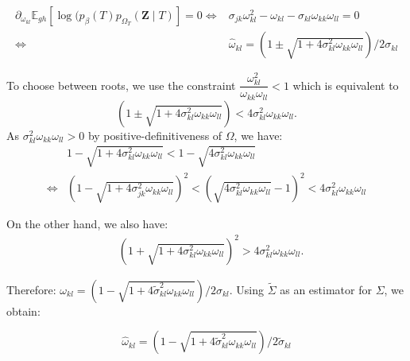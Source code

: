 \documentclass[11pt,a4paper]{article}
\newcommand{\Zbf}{\boldsymbol{Z}}
\newcommand{\Esp}{\mathds{E}}
\begin{document}
 \begin{align*}
  \partial_{\omega_{kl}}\Esp_{gh} [\log (p_\beta(T)p_{\Omega_T}(\Zbf\mid T) ] = 0 \iff & {\sigma}_{jk} \omega_{kl}^2 - \omega_{kl} - {\sigma}_{kl} \omega_{kk}\omega_{ll} = 0 \\
 \iff & \widehat{\omega}_{kl} = (1 \pm \sqrt{1+4{\sigma}_{kl}^2 \omega_{kk}\omega_{ll}}) / 2{\sigma}_{kl}
\end{align*}

To choose between roots, we use the constraint $\dfrac{\omega_{kl}^2}{\omega_{kk}\omega_{ll}} < 1$ which is equivalent to 
$$ (1 \pm \sqrt{1+4{\sigma}_{kl}^2 \omega_{kk}\omega_{ll}}) < 4{\sigma}_{kl}^2 \omega_{kk}\omega_{ll}.$$
As ${\sigma}_{kl}^2 \omega_{kk}\omega_{ll} > 0$ by positive-definitiveness of $\Omega$, we have:
\begin{align*}
&1 - \sqrt{1+4{\sigma}_{kl}^2 \omega_{kk}\omega_{ll}} < 1- \sqrt{4{\sigma}_{kl}^2 \omega_{kk}\omega_{ll}}\\
\iff &(1 - \sqrt{1+4{\sigma}_{jk}^2 \omega_{kk}\omega_{ll}})^2 < ( \sqrt{4{\sigma}_{kl}^2 \omega_{kk}\omega_{ll}}-1)^2 < 4{\sigma}_{kl}^2 \omega_{kk}\omega_{ll}
\end{align*}

On the other hand, we also have:
\begin{align*}
&(1 + \sqrt{1+4{\sigma}_{kl}^2 \omega_{kk}\omega_{ll}})^2 >4{\sigma}_{kl}^2 \omega_{kk}\omega_{ll}.
\end{align*}

Therefore: $ {\omega}_{kl} = (1 - \sqrt{1+4\widetilde{\sigma}_{kl}^2 \omega_{kk}\omega_{ll}}) / 2{\sigma}_{kl}$. Using $\widetilde{\Sigma}$ as an estimator for $\Sigma$, we obtain:

$$\boxed{ \widehat{\omega}_{kl} = (1 - \sqrt{1+4\widetilde{\sigma}_{kl}^2 \omega_{kk}\omega_{ll}}) / 2\widetilde{\sigma}_{kl}}$$
\end{document}
